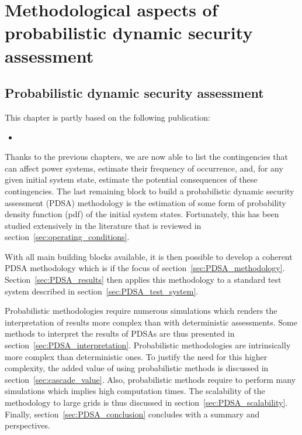 \part{Methodological aspects of probabilistic dynamic security assessment}
\label{part:PDSA}
\chapter{Probabilistic dynamic security assessment}
\label{ch:DPSA}
\minitoc

\begin{tcolorbox}[width=\linewidth, sharp corners=all,
    colback=white!80!black,
    colframe=white!80!black]
This chapter is partly based on the following publication:
\begin{itemize}
    \item {}
\end{itemize}
\end{tcolorbox}

Thanks to the previous chapters, we are now able to list the contingencies that can affect power systems, estimate their frequency of occurrence, and, for any given initial system state, estimate the potential consequences of these contingencies. The last remaining block to build a probabilistic dynamic security assessment (PDSA) methodology is the estimation of some form of probability density function (pdf) of the initial system states. Fortunately, this has been studied extensively in the literature that is reviewed in section~\ref{sec:operating_conditions}.

With all main building blocks available, it is then possible to develop a coherent PDSA methodology which is if the focus of section~\ref{sec:PDSA_methodology}. Section~\ref{sec:PDSA_results} then applies this methodology to a standard test system described in section~\ref{sec:PDSA_test_system}.

Probabilistic methodologies require numerous simulations which renders the interpretation of results more complex than with deterministic assessments. Some methods to interpret the results of PDSAs are thus presented in section~\ref{sec:PDSA_interpretation}. Probabilistic methodologies are intrinsically more complex than deterministic ones. To justify the need for this higher complexity, the added value of using probabilistic methods is discussed in section~\ref{sec:cascade_value}. Also, probabilistic methods require to perform many simulations which implies high computation times. The scalability of the methodology to large grids is thus discussed in section~\ref{sec:PDSA_scalability}. Finally, section~\ref{sec:PDSA_conclusion} concludes with a summary and perspectives.

